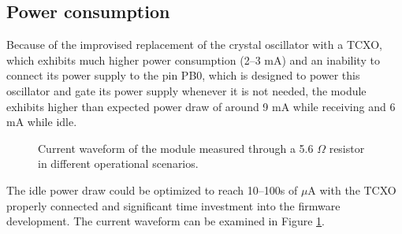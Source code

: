 \subsection{Power consumption}
Because of the improvised replacement of the crystal oscillator with a TCXO, which exhibits much higher power consumption (2--3 mA) and an inability to connect its power supply to the pin PB0, which is designed to power this oscillator and gate its power supply whenever it is not needed, the module exhibits higher than expected power draw of around 9 mA while receiving and 6 mA while idle.

\begin{figure}
    \centering
     \hfil
    \caption{\label{fig:module-current}Current waveform of the module measured through a 5.6 $\Omega$ resistor in different operational scenarios.}
\end{figure}

The idle power draw could be optimized to reach 10--100s of $\mu$A with the TCXO properly connected and significant time investment into the firmware development. The current waveform can be examined in Figure \ref{fig:module-current}.

